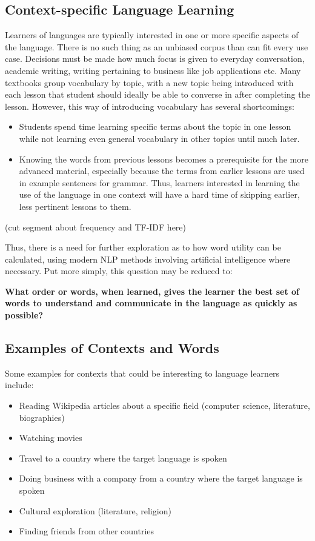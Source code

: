 
\subsection{Context-specific Language Learning}
Learners of languages are typically interested in one or more specific aspects of the language.
There is no such thing as an unbiased corpus than can fit every use case.
Decisions must be made how much focus is given to everyday conversation, academic writing, writing pertaining to business like job applications etc.
Many textbooks group vocabulary by topic, with a new topic being introduced with each lesson that student should ideally be able to converse in after completing the lesson.
However, this way of introducing vocabulary has several shortcomings:
\begin{itemize}
	\item Students spend time learning specific terms about the topic in one lesson while not learning even general vocabulary in other topics until much later.
	\item Knowing the words from previous lessons becomes a prerequisite for the more advanced material, especially because the terms from earlier lessons are used in example sentences for grammar.
	      Thus, learners interested in learning the use of the language in one context will have a hard time of skipping earlier, less pertinent lessons to them.
\end{itemize}


(cut segment about frequency and TF-IDF here)

Thus, there is a need for further exploration as to how word utility can be calculated, using modern NLP methods involving artificial intelligence where necessary.
Put more simply, this question may be reduced to:

\textbf{What order or words, when learned, gives the learner the best set of words to understand and communicate in the language as quickly as possible?}

\subsection{Examples of Contexts and Words}
Some examples for contexts that could be interesting to language learners include:

\begin{itemize}
	\item Reading Wikipedia articles about a specific field (computer science, literature, biographies)
	\item Watching movies
	\item Travel to a country where the target language is spoken
	\item Doing business with a company from a country where the target language is spoken
	\item Cultural exploration (literature, religion)
	\item Finding friends from other countries
\end{itemize}

